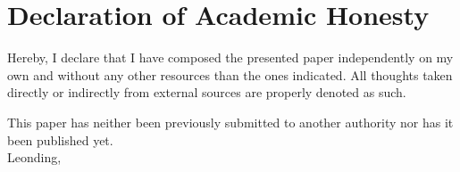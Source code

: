 \section*{Declaration of Academic Honesty}
Hereby, I declare that I have composed the presented paper independently on my own and without any other resources than the ones indicated. All thoughts taken directly or indirectly from external sources are properly denoted as such.

This paper has neither been previously submitted to another authority nor has it been published yet. \\[1em]
Leonding, \duedateen \\[5em]
\ifthenelse{\isundefined{\firstauthor}}{}{\firstauthor}
\ifthenelse{\isundefined{\secondauthor}}{}{\kern-1ex, \secondauthor}
\ifthenelse{\isundefined{\thirdauthor}}{}{\kern-1ex, \thirdauthor}
\ifthenelse{\isundefined{\fourthauthor}}{}{\kern-1ex, \fourthauthor} \\[5em]

